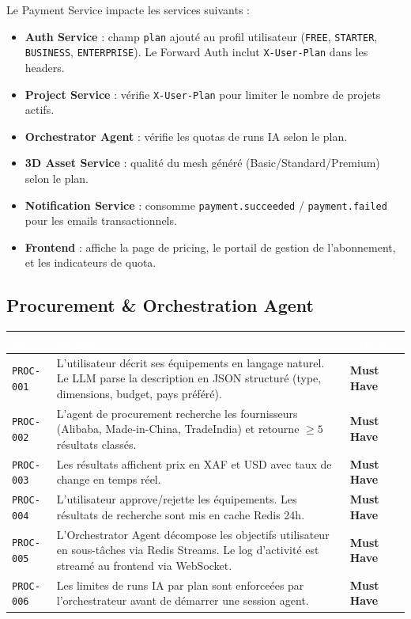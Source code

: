 \documentclass[12pt,a4paper]{article}
\newcommand{\req}[1]{\texttt{\textcolor{daedalusblue}{#1}}}
\newcommand{\musthave}{\cellcolor{musthave}\textbf{Must Have}}
\begin{document}
Le Payment Service impacte les services suivants :

\begin{itemize}
  \item \textbf{Auth Service} : champ \texttt{plan} ajouté au profil utilisateur (\texttt{FREE}, \texttt{STARTER}, \texttt{BUSINESS}, \texttt{ENTERPRISE}). Le Forward Auth inclut \texttt{X-User-Plan} dans les headers.
  \item \textbf{Project Service} : vérifie \texttt{X-User-Plan} pour limiter le nombre de projets actifs.
  \item \textbf{Orchestrator Agent} : vérifie les quotas de runs IA selon le plan.
  \item \textbf{3D Asset Service} : qualité du mesh généré (Basic/Standard/Premium) selon le plan.
  \item \textbf{Notification Service} : consomme \texttt{payment.succeeded} / \texttt{payment.failed} pour les emails transactionnels.
  \item \textbf{Frontend} : affiche la page de pricing, le portail de gestion de l'abonnement, et les indicateurs de quota.
\end{itemize}

\subsection{Procurement \& Orchestration Agent}

\begin{tabularx}{\textwidth}{|l|X|l|}
\hline
\rowcolor{tablehead}\textcolor{white}{\textbf{ID}} & \textcolor{white}{\textbf{Exigence}} & \textcolor{white}{\textbf{Priorité}} \\
\hline
\req{PROC-001} & L'utilisateur décrit ses équipements en langage naturel. Le LLM parse la description en JSON structuré (type, dimensions, budget, pays préféré). & \musthave \\
\hline
\req{PROC-002} & L'agent de procurement recherche les fournisseurs (Alibaba, Made-in-China, TradeIndia) et retourne $\geq 5$ résultats classés. & \musthave \\
\hline
\req{PROC-003} & Les résultats affichent prix en XAF et USD avec taux de change en temps réel. & \musthave \\
\hline
\req{PROC-004} & L'utilisateur approve/rejette les équipements. Les résultats de recherche sont mis en cache Redis 24h. & \musthave \\
\hline
\req{PROC-005} & L'Orchestrator Agent décompose les objectifs utilisateur en sous-tâches via Redis Streams. Le log d'activité est streamé au frontend via WebSocket. & \musthave \\
\hline
\req{PROC-006} & Les limites de runs IA par plan sont enforceées par l'orchestrateur avant de démarrer une session agent. & \musthave \\
\hline
\end{tabularx}
\end{document}
